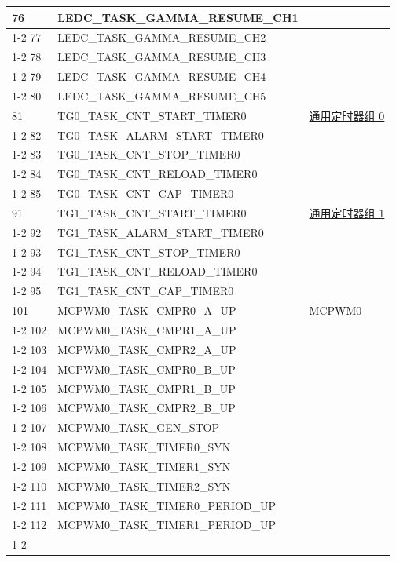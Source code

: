 \documentclass[main\_\_CN.tex]{subfiles}
\begin{document}
\begin{longtable}{ | l | l | l | }
76  & LEDC\_TASK\_GAMMA\_RESUME\_CH1& \\ \cline{1-2}
77  & LEDC\_TASK\_GAMMA\_RESUME\_CH2& \\ \cline{1-2}
78  & LEDC\_TASK\_GAMMA\_RESUME\_CH3& \\ \cline{1-2}
79  & LEDC\_TASK\_GAMMA\_RESUME\_CH4& \\ \cline{1-2}
80  & LEDC\_TASK\_GAMMA\_RESUME\_CH5& \\ \hline
81  & TG0\_TASK\_CNT\_START\_TIMER0     & \hyperref[mod:timg]{通用定时器组 0}\\ \cline{1-2}
82  & TG0\_TASK\_ALARM\_START\_TIMER0   & \\ \cline{1-2}
83  & TG0\_TASK\_CNT\_STOP\_TIMER0      & \\ \cline{1-2}
84  & TG0\_TASK\_CNT\_RELOAD\_TIMER0    & \\ \cline{1-2}
85  & TG0\_TASK\_CNT\_CAP\_TIMER0       & \\ \hline
91 & TG1\_TASK\_CNT\_START\_TIMER0     & \hyperref[mod:timg]{通用定时器组 1}\\ \cline{1-2}
92 & TG1\_TASK\_ALARM\_START\_TIMER0   & \\ \cline{1-2}
93 & TG1\_TASK\_CNT\_STOP\_TIMER0      & \\ \cline{1-2}
94 & TG1\_TASK\_CNT\_RELOAD\_TIMER0    & \\ \cline{1-2}
95 & TG1\_TASK\_CNT\_CAP\_TIMER0       & \\ \hline
101 & MCPWM0\_TASK\_CMPR0\_A\_UP& \hyperref[mod:mcpwm]{MCPWM0}\\ \cline{1-2}
102 & MCPWM0\_TASK\_CMPR1\_A\_UP& \\ \cline{1-2}
103 & MCPWM0\_TASK\_CMPR2\_A\_UP& \\ \cline{1-2}
104 & MCPWM0\_TASK\_CMPR0\_B\_UP& \\ \cline{1-2}
105 & MCPWM0\_TASK\_CMPR1\_B\_UP& \\ \cline{1-2}
106 & MCPWM0\_TASK\_CMPR2\_B\_UP& \\ \cline{1-2}
107 & MCPWM0\_TASK\_GEN\_STOP & \\ \cline{1-2}
108 & MCPWM0\_TASK\_TIMER0\_SYN & \\ \cline{1-2}
109 & MCPWM0\_TASK\_TIMER1\_SYN & \\ \cline{1-2}
110 & MCPWM0\_TASK\_TIMER2\_SYN & \\ \cline{1-2}
111 & MCPWM0\_TASK\_TIMER0\_PERIOD\_UP      & \\ \cline{1-2}
112 & MCPWM0\_TASK\_TIMER1\_PERIOD\_UP      & \\ \cline{1-2}

\end{longtable}
\end{document}
